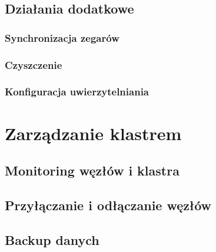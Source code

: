 \documentclass{article}
\begin{document}
\subsection{Działania dodatkowe}

\subsubsection{Synchronizacja zegarów}

\subsubsection{Czyszczenie}

\subsubsection{Konfiguracja uwierzytelniania}

\section{Zarządzanie klastrem}

\subsection{Monitoring węzłów i klastra}

\subsection{Przyłączanie i odłączanie węzłów}

\subsection{Backup danych}
\end{document}
